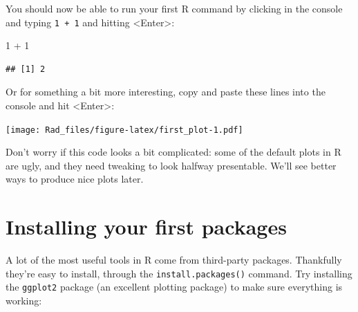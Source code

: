 \documentclass[
]{book}
\newenvironment{Shaded}{\begin{snugshade}}{\end{snugshade}}
\newcommand{\AttributeTok}[1]{\textcolor[rgb]{0.77,0.63,0.00}{#1}}
\newcommand{\DecValTok}[1]{\textcolor[rgb]{0.00,0.00,0.81}{#1}}
\newcommand{\FunctionTok}[1]{\textcolor[rgb]{0.00,0.00,0.00}{#1}}
\newcommand{\NormalTok}[1]{#1}
\newcommand{\SpecialCharTok}[1]{\textcolor[rgb]{0.00,0.00,0.00}{#1}}
\newcommand{\StringTok}[1]{\textcolor[rgb]{0.31,0.60,0.02}{#1}}
\begin{document}
You should now be able to run your first R command
by clicking in the console and typing \texttt{1\ +\ 1} and hitting
\textless Enter\textgreater:

\begin{Shaded}
\begin{Highlighting}[]
\DecValTok{1} \SpecialCharTok{+} \DecValTok{1}
\end{Highlighting}
\end{Shaded}

\begin{verbatim}
## [1] 2
\end{verbatim}

Or for something a bit more interesting, copy and paste these lines
into the console and hit \textless Enter\textgreater:

\begin{Shaded}
\end{Shaded}

\texttt{[image: Rad\_files/figure-latex/first\_plot-1.pdf]}

\begin{note}
Don't worry if this code looks a bit complicated: some of the default
plots in R are ugly, and they need tweaking to look halfway presentable.
We'll see better ways to produce nice plots later.
\end{note}

\hypertarget{installing-your-first-packages}{%
\section{Installing your first packages}\label{installing-your-first-packages}}

A lot of the most useful tools in R come from third-party packages. Thankfully
they're easy to install, through the \texttt{install.packages()} command. Try
installing the \texttt{ggplot2} package (an excellent plotting package) to make
sure everything is working:
\end{document}
